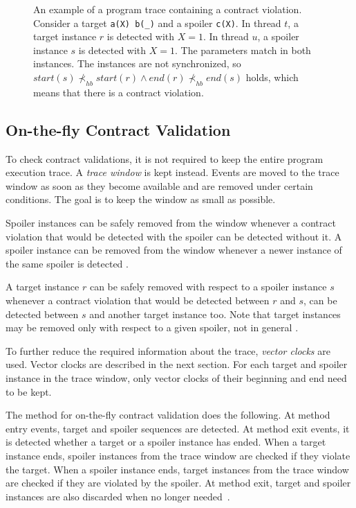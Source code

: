 \begin{figure}[hbt]
    \begin{center}
        \label{traces}
        
        \caption{An example of a program trace containing a contract violation.
        Consider a target \texttt{a(X) b(\_)} and a spoiler \texttt{c(X)}. In
        thread $t$, a target instance $r$ is detected with $X=1$. In thread $u$,
        a spoiler instance $s$ is detected with $X=1$. The parameters match in
        both instances. The instances are not synchronized, so $start(s)
        \nprec_{hb} start(r) \wedge end(r) \nprec_{hb} end(s)$ holds, which
        means that there is a contract violation.}
    \end{center}
\end{figure}

\subsection{On-the-fly Contract Validation}

To check contract validations, it is not required to keep the entire program
execution trace. A \emph{trace window} is kept instead. Events are moved to the
trace window as soon as they become available and are removed under certain
conditions. The goal is to keep the window as small as possible.

Spoiler instances can be safely removed from the window whenever a contract
violation that would be detected with the spoiler can be detected without it. A
spoiler instance can be removed from the window whenever a newer instance of the
same spoiler is detected \cite{contracts}.

A target instance $r$ can be safely removed with respect to a spoiler instance
$s$ whenever a contract violation that would be detected between $r$ and $s$,
can be detected between $s$ and another target instance too. Note that target
instances may be removed only with respect to a given spoiler, not in general
\cite{contracts}.

To further reduce the required information about the trace, \emph{vector clocks}
are used. Vector clocks are described in the next section. For each target and
spoiler instance in the trace window, only vector clocks of their beginning and
end need to be kept.

The method for on-the-fly contract validation does the following. At method
entry events, target and spoiler sequences are detected. At method exit events,
it is detected whether a target or a spoiler instance has ended. When a target
instance ends, spoiler instances from the trace window are checked if they
violate the target. When a spoiler instance ends, target instances from the
trace window are checked if they are violated by the spoiler. At method exit,
target and spoiler instances are also discarded when no longer
needed~\cite{contracts}.


